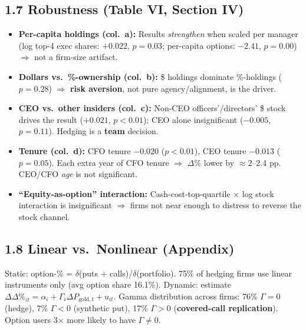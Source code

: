 \documentclass[11pt]{article}
\newcommand{\dP}{\Delta\%}
\begin{document}
\subsection*{1.7 Robustness (Table VI, Section IV)}
\begin{itemize}
\item \textbf{Per-capita holdings (col.\ a):} Results \emph{strengthen} when scaled per manager (log top-4 exec shares: $+0.022$, $p=0.03$; per-capita options: $-2.41$, $p=0.00$) $\Rightarrow$ not a firm-size artifact.
\item \textbf{Dollars vs.\ \%-ownership (col.\ b):} \$ holdings dominate \%-holdings ($p = 0.28$) $\Rightarrow$ \textbf{risk aversion}, not pure agency/alignment, is the driver.
\item \textbf{CEO vs.\ other insiders (col.\ c):} Non-CEO officers'/directors' \$ stock drives the result ($+0.021$, $p<0.01$); CEO alone insignificant ($-0.005$, $p=0.11$). Hedging is a \textbf{team} decision.
\item \textbf{Tenure (col.\ d):} CFO tenure $-0.020$ ($p<0.01$), CEO tenure $-0.013$ ($p=0.05$). Each extra year of CFO tenure $\Rightarrow$ $\dP$ lower by $\approx$2--2.4 pp. CEO/CFO \emph{age} is not significant.
\item \textbf{``Equity-as-option'' interaction:} Cash-cost-top-quartile $\times$ log stock interaction is insignificant $\Rightarrow$ firms not near enough to distress to reverse the stock channel.
\end{itemize}

\subsection*{1.8 Linear vs.\ Nonlinear (Appendix)}
Static: option-\% = $\delta$(puts $+$ calls)/$\delta$(portfolio). 75\% of hedging firms use linear instruments only (avg option share 16.1\%). Dynamic: estimate $\Delta\dP_{it} = \alpha_i + \Gamma_i \Delta P_{\text{gold},t} + u_{it}$. Gamma distribution across firms: 76\% $\Gamma = 0$ (hedge), 7\% $\Gamma<0$ (synthetic put), 17\% $\Gamma>0$ (\textbf{covered-call replication}). Option users 3$\times$ more likely to have $\Gamma\neq 0$.
\end{document}
